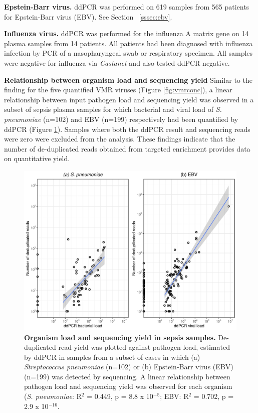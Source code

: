 \textbf{Epstein-Barr virus.} ddPCR was performed on 619 samples from 565 patients for Epstein-Barr virus (EBV). See Section ~\ref{sssec:ebv}.

\textbf{Influenza virus.} ddPCR was performed for the influenza A matrix gene on 14 plasma samples from 14 patients. All patients had been diagnosed with influenza infection by PCR of a nasopharyngeal swab or respiratory specimen. All samples were negative for influenza via \textit{Castanet} and also tested ddPCR negative. 

\textbf{Relationship between organism load and sequencing yield} Similar to the finding for the five quantified VMR viruses (Figure \ref{fig:vmrconc}), a linear relationship between input pathogen load and sequencing yield was observed in a subset of sepsis plasma samples for which bacterial and viral load of \textit{S. pneumoniae} (n=102) and EBV (n=199) respectively had been quantified by ddPCR (Figure \ref{fig:ddPCR}). Samples where both the ddPCR result and sequencing reads were zero were excluded from the analysis. These findings indicate that the number of de-duplicated reads obtained from targeted enrichment provides data on quantitative yield.

\FloatBarrier
\begin{figure}[htbp]
\centering
\includegraphics[scale=0.6]{./Results2/Images/ddPCR.pdf}
\caption[Organism load and sequencing yield in sepsis samples]{\textbf{Organism load and sequencing yield in sepsis samples.} De-duplicated read yield was plotted against pathogen load, estimated by ddPCR in samples from a subset of cases in which (a) \textit{Streptococcus pneumoniae} (n=102) or (b) Epstein-Barr virus (EBV) (n=199) was detected by sequencing. A linear relationship between pathogen load and sequencing yield was observed for each organism (\textit{S. pneumoniae}: R$^2$ = 0.449, p = 8.8 x 10$^{-5}$; EBV: R$^2$ = 0.702, p = 2.9 x 10$^{-16}$.}
\label{fig:ddPCR}
\end{figure}

